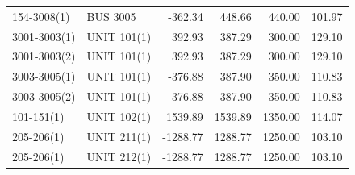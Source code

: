 \documentclass[10pt]{report}
\begin{document}
\begin{table}[H]
{\begin{tabular}{llrrrr}
154-3008(1) & BUS 3005 & -362.34 & 448.66 & 440.00 & 101.97 \\
3001-3003(1) & UNIT 101(1) & 392.93 & 387.29 & 300.00 & 129.10 \\
3001-3003(2) & UNIT 101(1) & 392.93 & 387.29 & 300.00 & 129.10 \\
3003-3005(1) & UNIT 101(1) & -376.88 & 387.90 & 350.00 & 110.83 \\
3003-3005(2) & UNIT 101(1) & -376.88 & 387.90 & 350.00 & 110.83 \\
101-151(1) & UNIT 102(1) & 1539.89 & 1539.89 & 1350.00 & 114.07 \\
205-206(1) & UNIT 211(1) & -1288.77 & 1288.77 & 1250.00 & 103.10 \\
205-206(1) & UNIT 212(1) & -1288.77 & 1288.77 & 1250.00 & 103.10 \\
\bottomrule
\end{tabular}}
\end{table}
\end{document}
